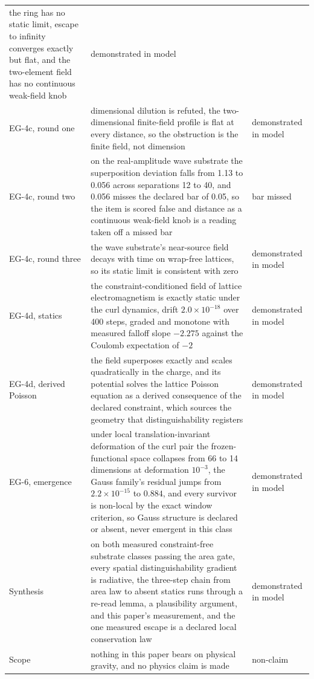 \documentclass[aps,pre,reprint,nofootinbib]{revtex4-2}
\begin{document}
\begin{table}[t]
\begin{ruledtabular}
\begin{tabular}{L{4.6cm} L{9.2cm} l}
the ring has no static limit, escape to infinity converges exactly
but flat, and the two-element field has no continuous weak-field
knob & demonstrated in model \\
EG-4c, round one & dimensional dilution is refuted, the
two-dimensional finite-field profile is flat at every distance, so
the obstruction is the finite field, not dimension & demonstrated in
model \\
EG-4c, round two & on the real-amplitude wave substrate the
superposition deviation falls from 1.13 to 0.056 across separations
12 to 40, and 0.056 misses the declared bar of 0.05, so the item is
scored false and distance as a continuous weak-field knob is a
reading taken off a missed bar & bar missed \\
EG-4c, round three & the wave substrate's near-source field decays
with time on wrap-free lattices, so its static limit is consistent
with zero & demonstrated in model \\
EG-4d, statics & the constraint-conditioned field of lattice
electromagnetism is exactly static under the curl dynamics, drift
$2.0\times10^{-18}$ over 400 steps, graded and monotone with
measured falloff slope $-2.275$ against the Coulomb expectation of
$-2$ & demonstrated in model \\
EG-4d, derived Poisson & the field superposes exactly and scales
quadratically in the charge, and its potential solves the lattice
Poisson equation as a derived consequence of the declared
constraint, which sources the geometry that distinguishability
registers & demonstrated in model \\
EG-6, emergence & under local translation-invariant deformation of
the curl pair the frozen-functional space collapses from 66 to 14
dimensions at deformation $10^{-3}$, the Gauss family's residual
jumps from $2.2\times10^{-15}$ to $0.884$, and every survivor is
non-local by the exact window criterion, so Gauss structure is
declared or absent, never emergent in this class & demonstrated in
model \\
Synthesis & on both measured constraint-free substrate classes
passing the area gate, every spatial distinguishability gradient is
radiative, the three-step chain from area law to absent statics runs
through a re-read lemma, a plausibility argument, and this paper's
measurement, and the one measured escape is a declared local
conservation law & demonstrated in model \\
Scope & nothing in this paper bears on physical gravity, and no
physics claim is made & non-claim \\
\end{tabular}
\end{ruledtabular}
\end{table}
\end{document}
